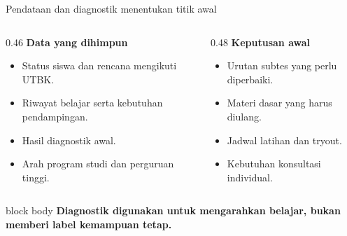 \begin{frame}[shrink=3]{Pendataan dan diagnostik menentukan titik awal}
  \begin{columns}[T,onlytextwidth]
    \begin{column}{0.46\textwidth}
      {\color{StudentBlue}\bfseries Data yang dihimpun}\par
      \begin{itemize}
        \item Status siswa dan rencana mengikuti UTBK.
        \item Riwayat belajar serta kebutuhan pendampingan.
        \item Hasil diagnostik awal.
        \item Arah program studi dan perguruan tinggi.
      \end{itemize}
    \end{column}
    \begin{column}{0.48\textwidth}
      {\color{StudentBlue}\bfseries Keputusan awal}\par
      \begin{itemize}
        \item Urutan subtes yang perlu diperbaiki.
        \item Materi dasar yang harus diulang.
        \item Jadwal latihan dan tryout.
        \item Kebutuhan konsultasi individual.
      \end{itemize}
    \end{column}
  \end{columns}
  \vspace{0.18cm}
  \begin{beamercolorbox}[rounded=true,sep=0.18cm,wd=\textwidth]{block body}
    \centering\bfseries Diagnostik digunakan untuk mengarahkan belajar, bukan memberi label kemampuan tetap.
  \end{beamercolorbox}
\end{frame}

